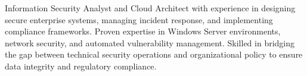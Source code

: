 \documentclass[a4paper,skipsamekey,11pt,english]{curve}
\begin{document}
\makeheaders[c]
Information Security Analyst and Cloud Architect with experience in designing secure enterprise systems, managing incident response, and implementing compliance frameworks. Proven expertise in Windows Server environments, network security, and automated vulnerability management. Skilled in bridging the gap between technical security operations and organizational policy to ensure data integrity and regulatory compliance.
\par\medskip





\end{document}
